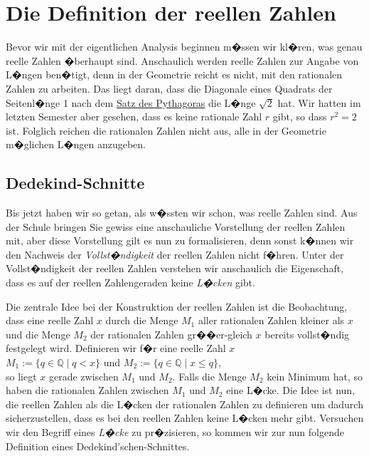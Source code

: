 \chapter{Die Definition der reellen Zahlen}
Bevor wir mit der eigentlichen Analysis beginnen m�ssen wir kl�ren, was genau reelle Zahlen
�berhaupt sind.  Anschaulich werden reelle Zahlen zur Angabe von L�ngen ben�tigt, denn in der Geometrie
reicht es nicht, mit den rationalen Zahlen zu arbeiten.  Das liegt daran, dass die Diagonale eines
Quadrats der Seitenl�nge 1 nach dem 
\href{http://de.wikipedia.org/wiki/Satz_des_Pythagoras}{Satz des Pythagoras} die L�nge $\sqrt{2}$ hat.
Wir hatten im letzten Semester aber gesehen, dass es keine rationale Zahl $r$ gibt,
so dass $r^2 = 2$ ist.  Folglich reichen die rationalen Zahlen nicht aus, alle in der Geometrie
m�glichen L�ngen anzugeben. 

\section{Dedekind-Schnitte}
Bis jetzt haben wir so getan, als w�ssten wir schon, was reelle Zahlen sind.  Aus der Schule bringen  
Sie gewiss eine anschauliche Vorstellung der reellen Zahlen mit, aber diese Vorstellung gilt es  
nun zu formalisieren, denn sonst k�nnen wir den Nachweis der \emph{Vollst�ndigkeit} der reellen  
Zahlen nicht f�hren.   Unter der Vollst�ndigkeit der reellen Zahlen verstehen wir anschaulich die Eigenschaft, 
dass es auf  der reellen Zahlengeraden keine \emph{L�cken} gibt.  

Die zentrale Idee bei der Konstruktion der reellen Zahlen ist die Beobachtung, dass eine reelle
Zahl $x$ durch die Menge $M_1$ aller rationalen Zahlen kleiner als $x$ und die Menge $M_2$ der
rationalen Zahlen gr��er-gleich $x$ bereits vollst�ndig festgelegt wird.  Definieren wir f�r eine
reelle Zahl $x$
\\[0.2cm]
\hspace*{1.3cm}
$M_1 := \{ q \in \mathbb{Q} \mid q < x \}$ \quad und \quad 
$M_2 := \{ q \in \mathbb{Q} \mid x \leq q \}$,
\\[0.2cm]
so liegt $x$ gerade zwischen $M_1$ und $M_2$.  Falls die Menge $M_2$ kein Minimum hat, so haben die
rationalen Zahlen  zwischen $M_1$ und $M_2$ eine L�cke.  Die Idee ist nun, die reellen Zahlen als
die L�cken der rationalen Zahlen zu definieren um dadurch sicherzustellen, dass es bei den
reellen Zahlen keine L�cken mehr gibt.  
Versuchen wir den Begriff eines \emph{L�cke} zu pr�zisieren, so kommen wir zur nun folgende Definition eines
Dedekind'schen-Schnittes.

